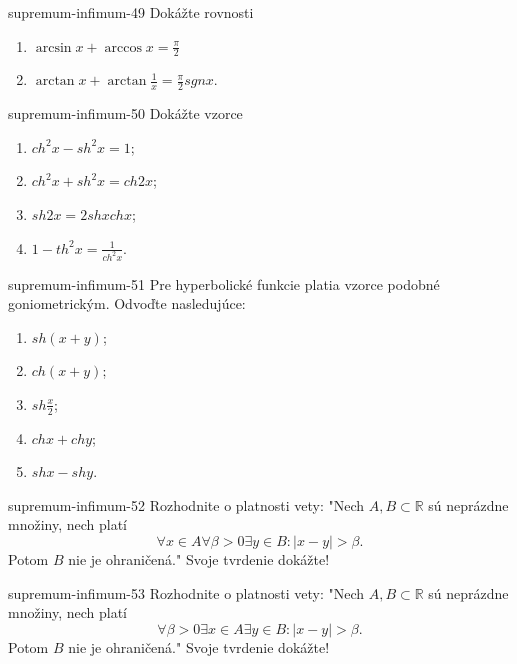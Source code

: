 \begin{defproblem}{supremum-infimum-49}
Dokážte rovnosti
\begin{enumerate}
\item $\arcsin x +\arccos x =\frac{\pi}{2}$
\item $\arctan x +\arctan\frac{1}{x}=\frac{\pi}{2}sgn x$.
\end{enumerate}
\end{defproblem}

\begin{defproblem}{supremum-infimum-50}
Dokážte vzorce
\begin{multicols}{2}
\begin{enumerate}
    \item $ch^2x-sh^2x=1$;
    \item $ch^2x+sh^2x=ch 2x$;
    \item $sh 2x =2sh x ch x$;
    \item $1-th^2x=\frac{1}{ch^2x}$.
\end{enumerate}
\end{multicols}
\end{defproblem}

\begin{defproblem}{supremum-infimum-51}
Pre hyperbolické funkcie platia vzorce podobné goniometrickým. Odvoďte nasledujúce:
\begin{multicols}{2}
\begin{enumerate}
    \item $sh(x+y)$;
    \item $ch(x+y)$;
    \item $sh\frac{x}{2}$;
    \item $ch x + ch y$;
    \item $sh x - sh y$.
\end{enumerate}
\end{multicols}
\end{defproblem}

\begin{defproblem}{supremum-infimum-52}
Rozhodnite o platnosti vety: "Nech $A,B\subset\mathbb{R}$ sú neprázdne množiny, nech platí $$\forall x\in A \forall \beta >0 \exists y\in B: |x-y|>\beta.$$ Potom $B$ nie je ohraničená." Svoje tvrdenie dokážte!
\end{defproblem}

\begin{defproblem}{supremum-infimum-53}
Rozhodnite o platnosti vety: "Nech $A,B\subset\mathbb{R}$ sú neprázdne množiny, nech platí $$\forall \beta >0 \exists x\in A \exists y\in B: |x-y|>\beta.$$ Potom $B$ nie je ohraničená." Svoje tvrdenie dokážte!
\end{defproblem}

